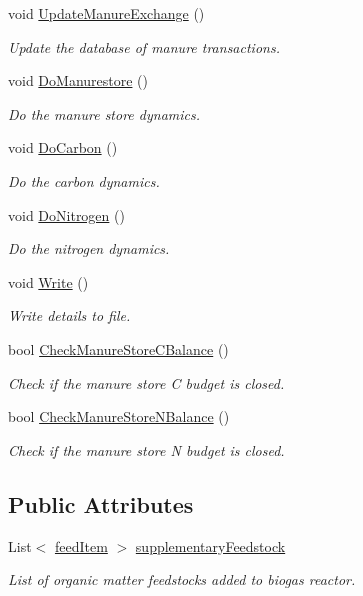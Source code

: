 \begin{DoxyCompactItemize}
void \mbox{\hyperlink{classmanure_store_a2018264038e021dc1bd770557587f468}{Update\+Manure\+Exchange}} ()
\begin{DoxyCompactList}\small\item\em Update the database of manure transactions. \end{DoxyCompactList}\item 
void \mbox{\hyperlink{classmanure_store_a82539494f37b506deb4c398558b7d9a3}{Do\+Manurestore}} ()
\begin{DoxyCompactList}\small\item\em Do the manure store dynamics. \end{DoxyCompactList}\item 
void \mbox{\hyperlink{classmanure_store_a4d1191eaab06551dece64f91c207e3f5}{Do\+Carbon}} ()
\begin{DoxyCompactList}\small\item\em Do the carbon dynamics. \end{DoxyCompactList}\item 
void \mbox{\hyperlink{classmanure_store_aada25a32d476b57dbeebd25786d5b0bf}{Do\+Nitrogen}} ()
\begin{DoxyCompactList}\small\item\em Do the nitrogen dynamics. \end{DoxyCompactList}\item 
void \mbox{\hyperlink{classmanure_store_a78539590211c7a2a278df92b41bbd1d0}{Write}} ()
\begin{DoxyCompactList}\small\item\em Write details to file. \end{DoxyCompactList}\item 
bool \mbox{\hyperlink{classmanure_store_a15e3ef4a2d1ffe2d556b213ff2b5c378}{Check\+Manure\+Store\+C\+Balance}} ()
\begin{DoxyCompactList}\small\item\em Check if the manure store C budget is closed. \end{DoxyCompactList}\item 
bool \mbox{\hyperlink{classmanure_store_a6aa8b1751c4d53ac68ec113efc055c1d}{Check\+Manure\+Store\+N\+Balance}} ()
\begin{DoxyCompactList}\small\item\em Check if the manure store N budget is closed. \end{DoxyCompactList}\end{DoxyCompactItemize}
\subsection*{Public Attributes}
\begin{DoxyCompactItemize}
\item 
List$<$ \mbox{\hyperlink{classfeed_item}{feed\+Item}} $>$ \mbox{\hyperlink{classmanure_store_a850d2cd27fa7400a7ab9fcda1272f79f}{supplementary\+Feedstock}}
\begin{DoxyCompactList}\small\item\em List of organic matter feedstocks added to biogas reactor. \end{DoxyCompactList}\end{DoxyCompactItemize}


